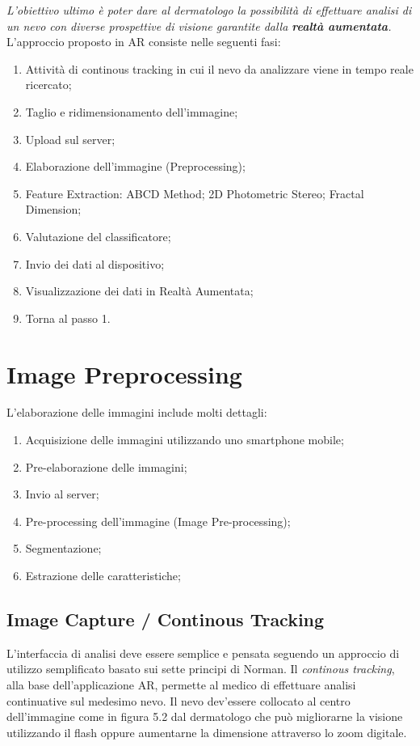 {\newline
\textit{L'obiettivo ultimo è poter dare al dermatologo la possibilità di effettuare analisi di un nevo con diverse prospettive di visione garantite dalla \textbf{realtà aumentata}.}
\newline
L'approccio proposto in AR consiste nelle seguenti fasi:
\begin{enumerate}
	\item Attività di continous tracking in cui il nevo da analizzare viene in tempo reale ricercato;
	\item Taglio e ridimensionamento dell'immagine;
	\item Upload sul server;
	\item Elaborazione dell'immagine (Preprocessing);
	\item Feature Extraction:
	\subitem ABCD Method;
	\subitem 2D Photometric Stereo;
	\subitem Fractal Dimension;
	\item Valutazione del classificatore;
	\item Invio dei dati al dispositivo;
	\item Visualizzazione dei dati in Realtà Aumentata;
	\item Torna al passo 1.
\end{enumerate}
\newpage
\section{Image Preprocessing}
L'elaborazione delle immagini include molti dettagli:
\begin{enumerate}
    \item Acquisizione delle immagini utilizzando uno smartphone mobile;
    \item Pre-elaborazione delle immagini;
    \item Invio al server;
    \item Pre-processing dell'immagine (Image Pre-processing);
    \item Segmentazione;
    \item Estrazione delle caratteristiche;
\end{enumerate}
\subsection{Image Capture / Continous Tracking}
L'interfaccia di analisi deve essere semplice e pensata seguendo un approccio di utilizzo semplificato basato sui sette principi di Norman.\cite{houser1998learning}
\newline
Il \textit{continous tracking}, alla base dell'applicazione AR, permette al medico di effettuare analisi continuative sul medesimo nevo.
Il nevo dev'essere collocato al centro dell'immagine come in figura 5.2 dal dermatologo che può migliorarne la visione utilizzando il flash oppure aumentarne la dimensione attraverso lo zoom digitale.
\newpage
}
